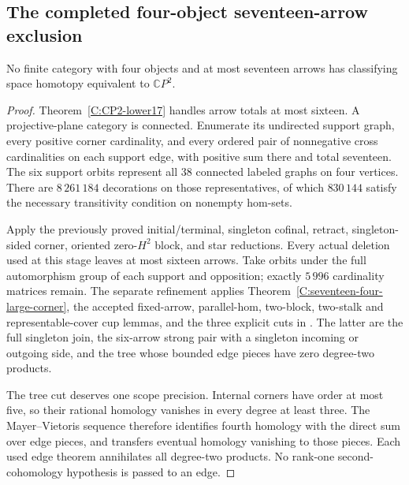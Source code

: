 \subsection{The completed four-object seventeen-arrow exclusion}

\begin{theorem}\label{C:seventeen-four-objects}
No finite category with four objects and at most seventeen arrows
has classifying space homotopy equivalent to $\mathbb CP^2$.

\end{theorem}
\begin{proof}
Theorem~\ref{C:CP2-lower17} handles arrow totals at most sixteen.
A projective-plane category is connected.  Enumerate its undirected
support graph, every positive corner cardinality, and every ordered
pair of nonnegative cross cardinalities on each support edge, with
positive sum there and total seventeen.  The six support orbits
represent all $38$ connected labeled graphs on four vertices.
There are $8\,261\,184$ decorations on those representatives,
of which $830\,144$ satisfy the necessary transitivity condition
on nonempty hom-sets.

Apply the previously proved initial/terminal, singleton cofinal,
retract, singleton-sided corner, oriented zero-$H^2$ block, and
star reductions.  Every actual deletion used at this stage leaves
at most sixteen arrows.  Take orbits under the full automorphism
group of each support and opposition; exactly $5\,996$ cardinality
matrices remain.  The separate refinement applies
Theorem~\ref{C:seventeen-four-large-corner}, the accepted fixed-arrow,
parallel-hom, two-block, two-stalk and representable-cover cup
lemmas, and the three explicit cuts in
.
The latter are the full singleton join, the six-arrow strong pair
with a singleton incoming or outgoing side, and the tree whose
bounded edge pieces have zero degree-two products.

The tree cut deserves one scope precision.  Internal corners have
order at most five, so their rational homology vanishes in every
degree at least three.  The Mayer--Vietoris sequence therefore
identifies fourth homology with the direct sum over edge pieces,
and transfers eventual homology vanishing to those pieces.  Each
used edge theorem annihilates all degree-two products.  No
rank-one second-cohomology hypothesis is passed to an edge.


\end{proof}
